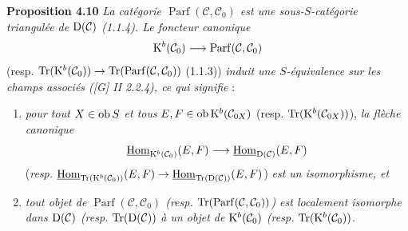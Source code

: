 \documentclass[11pt]{article}
\newcommand{\Parf}{\operatorname{Parf}}
\begin{document}
\textbf{Proposition 4.10} \emph{La catégorie \(\Parf(\mathcal C,\mathcal C_0)\) est une sous-\(S\)-catégorie triangulée de \(\mathrm D(\mathcal C)\) (1.1.4). Le foncteur canonique}
\[
  \Kpx^b(\mathcal C_0)\longrightarrow\Parf(\mathcal C,\mathcal C_0)
\]
(resp. \(\Tr(\Kpx^b(\mathcal C_0))\to\Tr(\Parf(\mathcal C,\mathcal C_0))\) (1.1.3)) \emph{induit une \(S\)-équivalence sur les champs associés ([G] II 2.2.4), ce qui signifie} :
\begin{enumerate}[label=(\roman*)]
\item \emph{pour tout \(X\in\operatorname{ob} S\) et tous} \(E,F\in\operatorname{ob}\mathrm K^b(\mathcal C_{0X})\) (resp. \(\operatorname{Tr}(\mathrm K^b(\mathcal C_{0X}))\)), \emph{la flèche canonique}
\[
  \underline{\operatorname{Hom}}_{\mathrm K^b(\mathcal C_0)}(E,F)
  \longrightarrow
  \underline{\operatorname{Hom}}_{\mathrm D(\mathcal C)}(E,F)
\]
(\emph{resp.} \(\underline{\operatorname{Hom}}_{\operatorname{Tr}(\mathrm K^b(\mathcal C_0))}(E,F)\to\underline{\operatorname{Hom}}_{\operatorname{Tr}(\mathrm D(\mathcal C))}(E,F)\)) \emph{est un isomorphisme, et}
\item \emph{tout objet de \(\Parf(\mathcal C,\mathcal C_0)\) (resp. \(\Tr(\Parf(\mathcal C,\mathcal C_0))\)) est localement isomorphe dans \(\mathrm D(\mathcal C)\) (resp.} \(\operatorname{Tr}(\mathrm D(\mathcal C))\) \emph{à un objet de \(\mathrm K^b(\mathcal C_0)\) (resp.} \(\operatorname{Tr}(\mathrm K^b(\mathcal C_0))\).
\end{enumerate}
\end{document}
